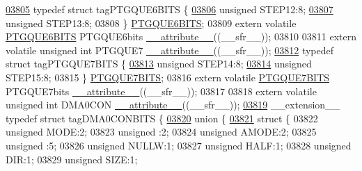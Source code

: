 \begin{DoxyCode}
\hypertarget{a00009_source_l03805}{}\hyperlink{a00008}{03805} \textcolor{keyword}{typedef} \textcolor{keyword}{struct }tagPTGQUE6BITS \{
\hypertarget{a00009_source_l03806}{}\hyperlink{a00008_af44a23d1cc0fa3fda040f9bff8cc19d1}{03806}   \textcolor{keywordtype}{unsigned} STEP12:8;
\hypertarget{a00009_source_l03807}{}\hyperlink{a00008_abdd685ca7ac89002c1130e1e0e8a37b9}{03807}   \textcolor{keywordtype}{unsigned} STEP13:8;
03808 \} \hyperlink{a00008_d1/d97/a00670}{PTGQUE6BITS};
03809 \textcolor{keyword}{extern} \textcolor{keyword}{volatile} \hyperlink{a00008_d1/d97/a00670}{PTGQUE6BITS} PTGQUE6bits \hyperlink{a00009_a493c46f03454991ccc5aa7a6e1dfb2a7}{\_\_attribute\_\_}((\_\_sfr\_\_));
03810 
03811 \textcolor{keyword}{extern} \textcolor{keyword}{volatile} \textcolor{keywordtype}{unsigned} \textcolor{keywordtype}{int}  PTGQUE7 \hyperlink{a00009_a493c46f03454991ccc5aa7a6e1dfb2a7}{\_\_attribute\_\_}((\_\_sfr\_\_));
\hypertarget{a00009_source_l03812}{}\hyperlink{a00008}{03812} \textcolor{keyword}{typedef} \textcolor{keyword}{struct }tagPTGQUE7BITS \{
\hypertarget{a00009_source_l03813}{}\hyperlink{a00008_a0e81977fa000fc2b0128943efe2fc72a}{03813}   \textcolor{keywordtype}{unsigned} STEP14:8;
\hypertarget{a00009_source_l03814}{}\hyperlink{a00008_a5d5ba25c4dd4a3183ec8fc7ed9a786fe}{03814}   \textcolor{keywordtype}{unsigned} STEP15:8;
03815 \} \hyperlink{a00008_d8/d13/a00671}{PTGQUE7BITS};
03816 \textcolor{keyword}{extern} \textcolor{keyword}{volatile} \hyperlink{a00008_d8/d13/a00671}{PTGQUE7BITS} PTGQUE7bits \hyperlink{a00009_a493c46f03454991ccc5aa7a6e1dfb2a7}{\_\_attribute\_\_}((\_\_sfr\_\_));
03817 
03818 \textcolor{keyword}{extern} \textcolor{keyword}{volatile} \textcolor{keywordtype}{unsigned} \textcolor{keywordtype}{int}  DMA0CON \hyperlink{a00009_a493c46f03454991ccc5aa7a6e1dfb2a7}{\_\_attribute\_\_}((\_\_sfr\_\_));
\hypertarget{a00009_source_l03819}{}\hyperlink{a00008}{03819} \_\_extension\_\_ \textcolor{keyword}{typedef} \textcolor{keyword}{struct }tagDMA0CONBITS \{
\hypertarget{a00009_source_l03820}{}\hyperlink{a00009}{03820}   \textcolor{keyword}{union }\{
\hypertarget{a00009_source_l03821}{}\hyperlink{a00009}{03821}     \textcolor{keyword}{struct }\{
03822       \textcolor{keywordtype}{unsigned} MODE:2;
03823       \textcolor{keywordtype}{unsigned} :2;
03824       \textcolor{keywordtype}{unsigned} AMODE:2;
03825       \textcolor{keywordtype}{unsigned} :5;
03826       \textcolor{keywordtype}{unsigned} NULLW:1;
03827       \textcolor{keywordtype}{unsigned} HALF:1;
03828       \textcolor{keywordtype}{unsigned} DIR:1;
03829       \textcolor{keywordtype}{unsigned} SIZE:1;

\end{DoxyCode}
